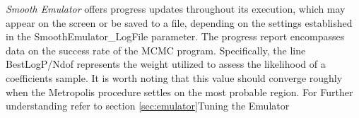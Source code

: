 \documentclass[main.tex]{subfiles}
\begin{document}
{\it Smooth Emulator} offers progress updates throughout its execution, which may appear on the screen or be saved to a file, depending on the settings established in the SmoothEmulator\_LogFile parameter. The progress report encompasses data on the success rate of the MCMC program. Specifically, the line BestLogP/Ndof represents the weight utilized to assess the likelihood of a coefficients sample. It is worth noting that this value should converge roughly when the Metropolis procedure settles on the most probable region. For Further understanding refer to section \ref{sec:emulator}{Tuning the Emulator}
\end{document}

